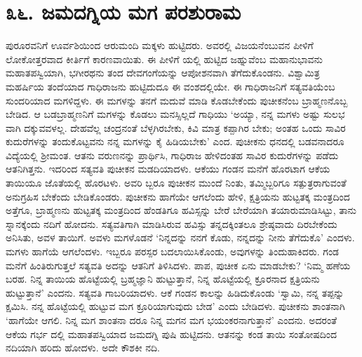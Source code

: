 
\chapter{೩೬. ಜಮದಗ್ನಿಯ ಮಗ ಪರಶುರಾಮ}

ಪುರೂರವನಿಗೆ ಊರ್ವಶಿಯಿಂದ ಆರುಮಂದಿ ಮಕ್ಕಳು ಹುಟ್ಟಿದರು. ಅವರಲ್ಲಿ ವಿಜಯನೆಂಬುವನ ಪೀಳಿಗೆ ಲೋಕೋತ್ತರವಾದ ಕೀರ್ತಿಗೆ ಕಾರಣವಾಯಿತು. ಈ ಪೀಳಿಗೆ ಯಲ್ಲಿ ಹುಟ್ಟಿದ ಜಹ್ನುವೆಂಬ ಮಹಾನುಭಾವನು ಮಹಾತಪಸ್ವಿಯಾಗಿ, ಭಗೀರಥನು ತಂದ ದೇವಗಂಗೆಯನ್ನು ಆಪೋಶನವಾಗಿ ತೆಗೆದುಕೊಂಡನು. ವಿಶ್ವಾಮಿತ್ರ ಮಹರ್ಷಿಯ ತಂದೆಯಾದ ಗಾಧಿರಾಜನು ಹುಟ್ಟಿದುದೂ ಈ ವಂಶದಲ್ಲಿಯೇ. ಈ ಗಾಧಿರಾಜನಿಗೆ ಸತ್ಯವತಿಯೆಂಬ ಸುಂದರಿಯಾದ ಮಗಳಿದ್ದಳು. ಈ ಮಗಳನ್ನು ತನಗೆ ಮದುವೆ ಮಾಡಿ ಕೊಡಬೇಕೆಂದು ಪುಚೀಕನೆಂಬ ಬ್ರಾಹ್ಮಣನೊಬ್ಬ ಬೇಡಿದ. ಆ ಬಡಬ್ರಾಹ್ಮಣನಿಗೆ ಮಗಳನ್ನು ಕೊಡಲು ಮನಸ್ಸಿಲ್ಲದೆ ಗಾಧಿಯು ‘ಅಯ್ಯಾ, ನನ್ನ ಮಗಳು ಅಷ್ಟು ಸುಲಭ ವಾಗಿ ದಕ್ಕುವವಳಲ್ಲ. ದೇಹವೆಲ್ಲ ಚಂದ್ರನಂತೆ ಬೆಳ್ಳಗಿರಬೇಕು, ಕಿವಿ ಮಾತ್ರ ಕಪ್ಪಾಗಿರ ಬೇಕು; ಅಂತಹ ಒಂದು ಸಾವಿರ ಕುದುರೆಗಳನ್ನು ತಂದುಕೊಟ್ಟವನು ನನ್ನ ಮಗಳನ್ನು ಕೈ ಹಿಡಿಯಬೇಕು’ ಎಂದ. ಪುಚೀಕನು ಧನದಲ್ಲಿ ಬಡವನಾದರೂ ವಿದ್ಯೆಯಲ್ಲಿ ಶ್ರೀಮಂತ. ಆತನು ವರುಣನನ್ನು ಪ್ರಾರ್ಥಿಸಿ, ಗಾಧಿರಾಜ ಹೇಳಿದಂತಹ ಸಾವಿರ ಕುದುರೆಗಳನ್ನು ಪಡೆದು ಆತನಿಗಿತ್ತನು. ಇದರಿಂದ ಸತ್ಯವತಿ ಪುಚೀಕನ ಮಡದಿಯಾದಳು. ಆಕೆಯು ಗಂಡನ ಮನೆಗೆ ಹೊರಟಾಗ ಆಕೆಯ ತಾಯಿಯೂ ಜೊತೆಯಲ್ಲಿ ಹೊರಟಳು. ಅವರಿ ಬ್ಬರೂ ಪುಚೀಕನ ಮುಂದೆ ನಿಂತು, ತಮ್ಮಿಬ್ಬರಿಗೂ ಸತ್ಪುತ್ರರಾಗುವಂತೆ ಅನುಗ್ರಹಿಸ ಬೇಕೆಂದು ಬೇಡಿಕೊಂಡರು. ಪುಚೀಕನು ಹಾಗೆಯೇ ಆಗಲೆಂದು ಹೇಳಿ, ಕ್ಷತ್ರಿಯನು ಹುಟ್ಟತಕ್ಕ ಮಂತ್ರದಿಂದ ಅತ್ತೆಗೂ, ಬ್ರಾಹ್ಮಣನು ಹುಟ್ಟತಕ್ಕ ಮಂತ್ರದಿಂದ ಹೆಂಡತಿಗೂ ಹವಿಸ್ಸನ್ನು ಬೇರೆ ಬೇರೆಯಾಗಿ ತಯಾರುಮಾಡಿಸಿಟ್ಟು, ತಾನು ಸ್ನಾನಕ್ಕೆಂದು ನದಿಗೆ ಹೋದನು. ಸತ್ಯವತಿಗಾಗಿ ಮಾಡಿಸಿರುವ ಹವಿಸ್ಸು ತನ್ನದಕ್ಕಿಂತಲೂ ಶ್ರೇಷ್ಠವಾದು ದಿರಬೇಕೆಂದು ಅನಿಸಿತು, ಅವಳ ತಾಯಿಗೆ. ಅವಳು ಮಗಳೊಡನೆ ‘ನಿನ್ನದನ್ನು ನನಗೆ ಕೊಡು, ನನ್ನದನ್ನು ನೀನು ತೆಗೆದುಕೊ’ ಎಂದಳು. ಮಗಳು ಹಾಗೆಯೆ ಆಗಲೆಂದಳು. ಇಬ್ಬರೂ ಪರಸ್ಪರ ಬದಲಾಯಿಸಿಕೊಂಡು, ಅವುಗಳನ್ನು ತಿಂದುಹಾಕಿದರು. ಗಂಡ ಮನೆಗೆ ಹಿಂತಿರುಗುತ್ತಲೆ ಸತ್ಯವತಿ ಅದನ್ನು ಆತನಿಗೆ ತಿಳಿಸಿದಳು. ಪಾಪ, ಪುಚೀಕ ಏನು ಮಾಡಬೇಕು? ‘ನಿಮ್ಮ ಹಣೆಯ ಬರಹ. ನಿನ್ನ ತಾಯಿಯ ಹೊಟ್ಟೆಯಲ್ಲಿ ಬ್ರಹ್ಮಜ್ಞಾನಿ ಹುಟ್ಟುತ್ತಾನೆ, ನಿನ್ನ ಹೊಟ್ಟೆಯಲ್ಲಿ ಕ್ರೂರನಾದ ಕ್ಷತ್ರಿಯನು ಹುಟ್ಟುತ್ತಾನೆ’ ಎಂದನು. ಸತ್ಯವತಿ ಗಾಬರಿಯಾದಳು. ಆಕೆ ಗಂಡನ ಕಾಲನ್ನು ಹಿಡಿದುಕೊಂಡು ‘ಸ್ವಾಮಿ, ನನ್ನ ತಪ್ಪನ್ನು ಕ್ಷಮಿಸಿ. ನನ್ನ ಹೊಟ್ಟೆಯಲ್ಲಿ ಹುಟ್ಟುವ ಮಗ ಕ್ರೂರಿಯಾಗುವುದು ಬೇಡ’ ಎಂದು ಬೇಡಿದಳು. ಪುಚೀಕನು ಶಾಂತನಾಗಿ ‘ಹಾಗೆಯೇ ಆಗಲಿ. ನಿನ್ನ ಮಗ ಶಾಂತನಾ ದರೂ ನಿನ್ನ ಮಗನ ಮಗ ಭಯಂಕರನಾಗುತ್ತಾನೆ’ ಎಂದನು. ಅದರಂತೆ ಆಕೆಯ ಗರ್ಭ ದಲ್ಲಿ ಮಹಾತಪಸ್ವಿಯಾದ ಜಮದಗ್ನಿ ಪುಷಿ ಹುಟ್ಟಿದನು. ಆತನನ್ನು ಕಂಡ ತಾಯಿ ಸಂತೋಷದಿಂದ ನದಿಯಾಗಿ ಹರಿದು ಹೋದಳು. ಅದೇ ಕೌಶಕೀ ನದಿ.

